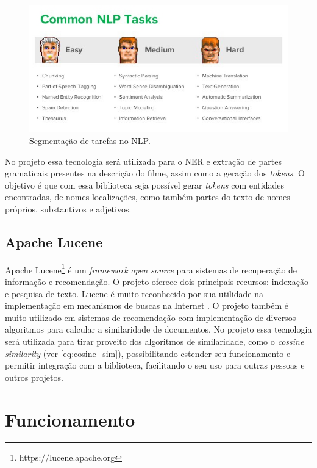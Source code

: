 \begin{figure}
	\centering
	\includegraphics[scale=1]{imagens/nlp.jpg}
	\caption{Segmentação de tarefas no NLP. \citep{NLP2016}}
	\label{fig:nlp}
\end{figure}

No projeto essa tecnologia será utilizada para o \ac{NER} e extração de partes gramaticais presentes na descrição do filme, assim como a geração dos \textit{tokens}. O objetivo é que com essa biblioteca seja possível gerar \textit{tokens} com entidades encontradas, de nomes localizações, como também partes do texto de nomes próprios, substantivos e adjetivos.

\subsection{Apache Lucene}

Apache Lucene\footnote{https://lucene.apache.org} é um \textit{framework} \textit{open source} para sistemas de recuperação de informação e recomendação. O projeto oferece dois principais recursos: indexação e pesquisa de texto. Lucene é muito reconhecido por sua utilidade na implementação em mecanismos de buscas na Internet \citep{McCandless2010}. O projeto também é muito utilizado em sistemas de recomendação com implementação de diversos algoritmos para calcular a similaridade de documentos.
No projeto essa tecnologia será utilizada para tirar proveito dos algoritmos de similaridade, como o \textit{cossine similarity} (ver \ref{eq:cosine_sim}), possibilitando estender seu funcionamento e permitir integração com a biblioteca, facilitando o seu uso para outras pessoas e outros projetos.

\section{Funcionamento}

